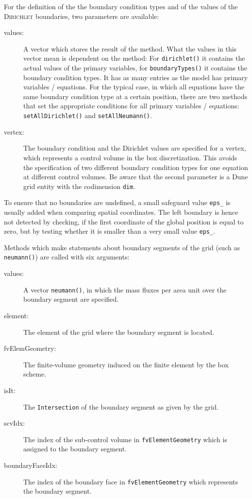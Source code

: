 For the definition of the the boundary condition types and of the
values of the \textsc{Dirichlet} boundaries, two parameters are
available:
\begin{description}
 \item [values:]  A vector which stores the result of the method. What
  the values in this vector mean is dependent on the method: For
  \texttt{dirichlet()} it contains the actual values of the primary
  variables, for \texttt{boundaryTypes()} it contains the boundary 
  condition types. It has as many entries as the model has primary variables / equations.
  For the typical case, in which all equations have the same boundary
  condition type at a certain position, there are two methods that set the appropriate conditions
  for all primary variables / equations: \texttt{setAllDirichlet()} and \texttt{setAllNeumann()}.
\item [vertex:] The boundary condition and the Dirichlet values are
  specified for a vertex, which represents a control volume in the box
  discretization. This avoids the specification of two different
  boundary condition types for one equation at different control
  volumes.  Be aware that the second parameter is a Dune grid entity
  with the codimension \texttt{dim}.
\end{description}

To ensure that no boundaries are undefined, a small safeguard value
\texttt{eps\_} is usually added when comparing spatial
coordinates. The left boundary is hence not detected by checking, if the
first coordinate of the global position is equal to zero, but by testing whether it is
smaller than a very small value \texttt{eps\_}.

Methods which make statements about boundary segments of the grid
(such as \texttt{neumann()}) are called with six arguments:
\begin{description}
\item[values:] A vector \texttt{neumann()}, in which the mass fluxes per area unit
  over the boundary segment are specified.
\item[element:] The element of the grid where the boundary segment
  is located.
\item[fvElemGeometry:] The finite-volume geometry induced on the
  finite element by the box scheme.
\item[isIt:] The \texttt{Intersection} of the boundary segment as given by the grid.
\item[scvIdx:] The index of the sub-control volume in
  \texttt{fvElementGeometry} which is assigned to the boundary segment.
\item[boundaryFaceIdx:] The index of the boundary face in
  \texttt{fvElementGeometry} which represents the boundary segment.  
\end{description}

